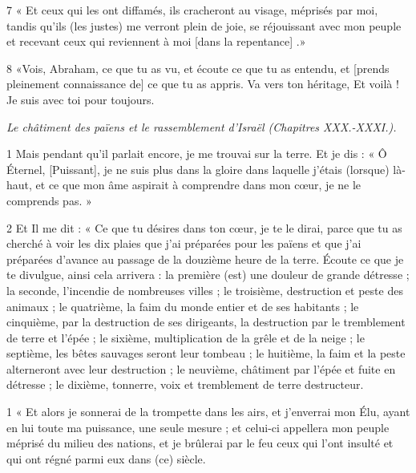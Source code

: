 \par 7 « Et ceux qui les ont diffamés, ils cracheront au visage, méprisés par moi, tandis qu'ils (les justes) me verront plein de joie, se réjouissant avec mon peuple et recevant ceux qui reviennent à moi [dans la repentance] .»

\par 8 «Vois, Abraham, ce que tu as vu, et écoute ce que tu as entendu, et [prends pleinement connaissance de] ce que tu as appris. Va vers ton héritage, Et voilà ! Je suis avec toi pour toujours.


\par \textit{Le châtiment des païens et le rassemblement d'Israël (Chapitres XXX.-XXXI.).}

\par 1 Mais pendant qu'il parlait encore, je me trouvai sur la terre. Et je dis : « Ô Éternel, [Puissant], je ne suis plus dans la gloire dans laquelle j’étais (lorsque) là-haut, et ce que mon âme aspirait à comprendre dans mon cœur, je ne le comprends pas. »

\par 2 Et Il me dit : « Ce que tu désires dans ton cœur, je te le dirai, parce que tu as cherché à voir les dix plaies que j'ai préparées pour les païens et que j'ai préparées d'avance au passage de la douzième heure de la terre. Écoute ce que je te divulgue, ainsi cela arrivera : la première (est) une douleur de grande détresse ; la seconde, l'incendie de nombreuses villes ; le troisième, destruction et peste des animaux ; le quatrième, la faim du monde entier et de ses habitants ; le cinquième, par la destruction de ses dirigeants, la destruction par le tremblement de terre et l'épée ; le sixième, multiplication de la grêle et de la neige ; le septième, les bêtes sauvages seront leur tombeau ; le huitième, la faim et la peste alterneront avec leur destruction ; le neuvième, châtiment par l'épée et fuite en détresse ; le dixième, tonnerre, voix et tremblement de terre destructeur.


\par 1 « Et alors je sonnerai de la trompette dans les airs, et j'enverrai mon Élu, ayant en lui toute ma puissance, une seule mesure ; et celui-ci appellera mon peuple méprisé du milieu des nations, et je brûlerai par le feu ceux qui l'ont insulté et qui ont régné parmi eux dans (ce) siècle.

